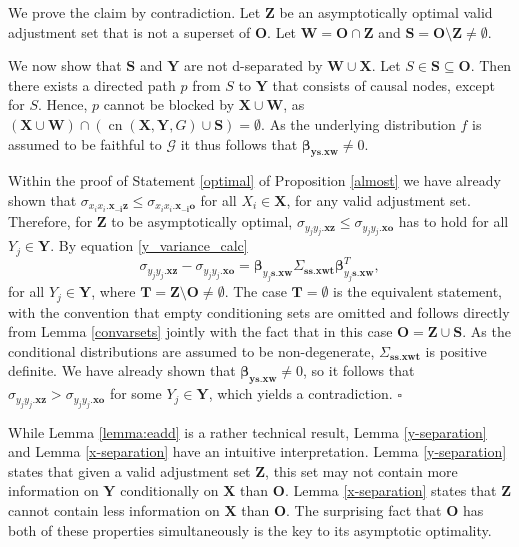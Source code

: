 \documentclass[11pt,a4paper]{article}
\theoremstyle{definition}
\theoremstyle{remark}
\newenvironment{proofof}[1][]{\begin{trivlist}
\item[\hskip \labelsep {\textit{Proof of #1.}}]}{\hfill{}$\square$\end{trivlist}}
\DeclareMathOperator{\CN}{cn}
\newcommand{\g}[1][G]{\mathcal{#1}}
\newcommand{\cnb}[2][X,Y]{\CN(\mathbf{#1},#2)}
\begin{document}
\begin{proofof}[of Statement \ref{smallest} of Proposition \ref{almost}]
	We prove the claim by contradiction. Let $\mathbf{Z}$ be an asymptotically optimal valid adjustment set that is not a superset of $\mathbf{O}$. Let $\mathbf{W}=\mathbf{O} \cap \mathbf{Z}$ and $\mathbf{S} =\mathbf{O} \setminus \mathbf{Z} \neq \emptyset$. 
	
	We now show that $\mathbf{S}$ and $\mathbf{Y}$ are not d-separated by $\mathbf{W} \cup \mathbf{X}$. Let $S \in\mathbf{S} \subseteq \mathbf{O}$. Then there exists a directed  path $p$ from $S$ to $\mathbf{Y}$ that consists of causal nodes, except for $S$. Hence, $p$ cannot be blocked by $\mathbf{X} \cup \mathbf{W}$, as $(\mathbf{X} \cup \mathbf{W}) \cap (\cnb{G} \cup \mathbf{S}) = \emptyset$. As the underlying distribution $f$ is assumed to be faithful to $\g$ it thus follows that $\boldsymbol{\beta}_{\mathbf{ys}.\mathbf{xw}} \neq 0$.
	
	Within the proof of Statement \ref{optimal} of Proposition \ref{almost} we have already shown that $\sigma_{x_ix_i.\mathbf{x_{-i}z}} \leq \sigma_{x_ix_i.\mathbf{x_{-i}o}}$ for all $X_i \in \mathbf{X}$, for any valid adjustment set. Therefore, for $\mathbf{Z}$ to be asymptotically optimal, $\sigma_{y_jy_j.\mathbf{xz}} \leq \sigma_{y_jy_j.\mathbf{xo}}$ has to hold for all $Y_j \in \mathbf{Y}$. 
	By equation \eqref{y_variance_calc}
	\[
	\sigma_{y_jy_j.\mathbf{xz}} - \sigma_{y_jy_j.\mathbf{xo}} = \boldsymbol{\beta}_{y_j\mathbf{s}.\mathbf{xw}} \Sigma_{\mathbf{ss}.\mathbf{xwt}} \boldsymbol{\beta}^T_{y_j\mathbf{s}.\mathbf{xw}},
	\]
 for all $Y_j \in \mathbf{Y}$, 	where $\mathbf{T} = \mathbf{Z} \setminus \mathbf{O} \neq \emptyset$. The case $\mathbf{T}= \emptyset$ is the equivalent statement, with the convention that empty conditioning sets are omitted and  follows directly from Lemma \ref{convarsets} jointly with the fact that in this case $\mathbf{O}=\mathbf{Z} \cup \mathbf{S}$. As the conditional distributions are assumed to be non-degenerate, 
	$\Sigma_{\mathbf{ss}.\mathbf{xwt}}$ is positive definite. We have already shown that $\boldsymbol{\beta}_{\mathbf{ys}.\mathbf{xw}} \neq 0$, so it follows that $\sigma_{y_jy_j.\mathbf{xz}} > \sigma_{y_jy_j.\mathbf{xo}}$ for some $Y_j \in \mathbf{Y}$, which yields a contradiction. 
\end{proofof}

While Lemma \ref{lemma:eadd} is a rather technical result, Lemma \ref{y-separation} and Lemma \ref{x-separation} have an intuitive interpretation. Lemma \ref{y-separation} states that given a valid adjustment set $\mathbf{Z}$, this set may not contain more information on $\mathbf{Y}$ conditionally on $\mathbf{X}$ than $\mathbf{O}$. Lemma \ref{x-separation} states that $\mathbf{Z}$ cannot contain less information on $\mathbf{X}$ than $\mathbf{O}$. The surprising fact that $\mathbf{O}$ has both of these properties simultaneously is the key to its asymptotic optimality.  
\end{document}
